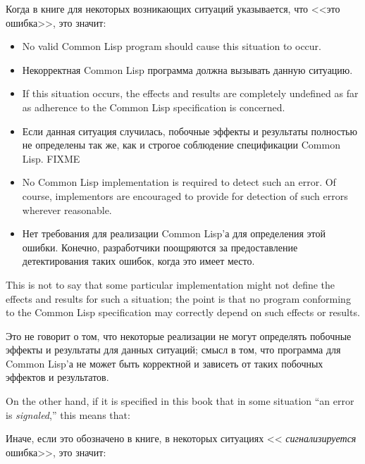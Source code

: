 Когда в книге для некоторых возникающих ситуаций указывается, что <<это
ошибка>>, это значит: 
\begin{itemize}
\item No valid Common Lisp program should cause this situation to occur.

\item Некорректная Common Lisp программа должна вызывать данную ситуацию.

\item If this situation occurs, the effects and results are completely
undefined as far as adherence to the Common Lisp specification is concerned.

\item Если данная ситуация случилась, побочные эффекты и результаты полностью не
определены так же, как и строгое соблюдение спецификации Common Lisp. FIXME

\item No Common Lisp implementation is required to detect such an error.
Of course, implementors are encouraged to provide for detection
of such errors wherever reasonable.

\item Нет требования для реализации Common Lisp'а для определения этой
ошибки. Конечно, разработчики поощряются за предоставление детектирования таких
ошибок, когда это имеет место.
\end{itemize}
This is not to say that some particular implementation might not define
the effects and results for such a situation; the point is that no program
conforming to the Common Lisp specification may correctly depend on such
effects or results.

Это не говорит о том, что некоторые реализации не могут определять
побочные эффекты и результаты для данных ситуаций; смысл в том, что программа для
Common Lisp'а не может быть корректной и зависеть от таких побочных эффектов и результатов.

On the other hand, if it is specified in this book that in some situation
``an error is \textit{signaled},'' this means that:

Иначе, если это обозначено в книге, в некоторых ситуациях <<{\it
сигнализируется} ошибка>>, это значит:


